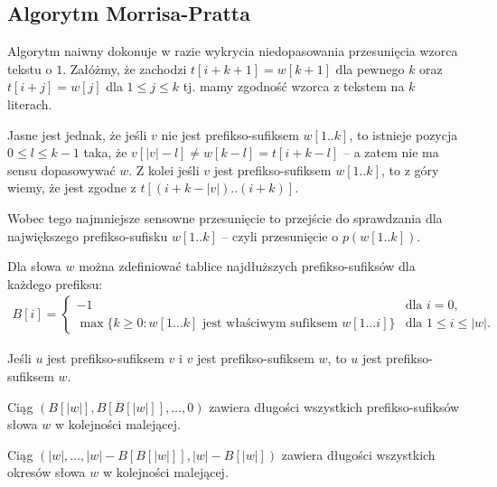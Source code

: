 \subsection{Algorytm Morrisa-Pratta}

Algorytm naiwny dokonuje w razie wykrycia niedopasowania przesunięcia wzorca tekstu o $1$.
Załóżmy, że zachodzi $t[i + k + 1] = w[k + 1]$ dla pewnego $k$ oraz $t[i + j] = w[j]$ dla $1 \le j \le k$ tj. mamy zgodność wzorca z tekstem na $k$ literach.

Jasne jest jednak, że jeśli $v$ nie jest prefikso-sufiksem $w[1..k]$, to istnieje pozycja $0 \le l \le k - 1$ taka, że $v[|v| - l] \neq w[k - l] = t[i + k - l]$ -- a zatem nie ma sensu dopasowywać $w$. Z kolei jeśli $v$ jest prefikso-sufiksem $w[1..k]$, to z góry wiemy, że jest zgodne z $t[(i + k - |v|)..(i + k)]$.

Wobec tego najmniejsze sensowne przesunięcie to przejście do sprawdzania dla największego prefikso-sufisku $w[1..k]$ -- czyli przesunięcie o $p(w[1..k])$.

Dla słowa $w$ można zdefiniować tablice najdłuższych prefikso-sufiksów dla każdego prefiksu:
\begin{align*}
  B[i] = 
  \begin{cases}
    -1 & \text{dla $i = 0$,} \\
    \max\{k \ge 0:\text{$w[1 \ldots k]$ jest właściwym sufiksem $w[1\ldots i]$}\} & \text{dla $1 \le i \le |w|$.}
  \end{cases}
\end{align*}

\begin{lemma}{}{}
  \label{lem:pref-suf}
  Jeśli $u$ jest prefikso-sufiksem $v$ i $v$ jest prefikso-sufiksem $w$, to $u$ jest prefikso-sufiksem $w$.
\end{lemma}

\begin{corollary}{}{}
  Ciąg $(B[|w|], B[B[|w|]], \ldots, 0)$ zawiera długości wszystkich prefikso-sufiksów słowa $w$ w kolejności malejącej.
\end{corollary}

\begin{corollary}{}{}
  Ciąg $(|w|, \ldots, |w| - B[B[|w|]], |w| - B[|w|])$ zawiera długości wszystkich okresów słowa $w$ w kolejności malejącej.
\end{corollary}

\begin{code}
\inputminted{python}{code/other/prefix-suffix.py}
\label{alg:prefix-suffix}
\end{code}

